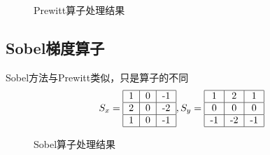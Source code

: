 \documentclass[UTF8]{ctexart}
\begin{document}
\begin{figure}[htbp]
\centering
{}
\caption{Prewitt算子处理结果}
\end{figure}

\subsection{Sobel梯度算子}
Sobel方法与Prewitt类似，只是算子的不同
\[
S_x = 
\begin{tabular}{|c|c|c|}
\hline
1 & 0 & -1 \\
\hline
2 & 0 & -2 \\
\hline
1 & 0 & -1 \\
\hline
\end{tabular},
S_y = 
\begin{tabular}{|c|c|c|}
\hline
1 & 2 & 1 \\
\hline
0 & 0 & 0 \\
\hline
-1 & -2 & -1\\
\hline
\end{tabular}
\]

\begin{figure}[htbp]
\centering
{}
\caption{Sobel算子处理结果}
\end{figure}
\end{document}
